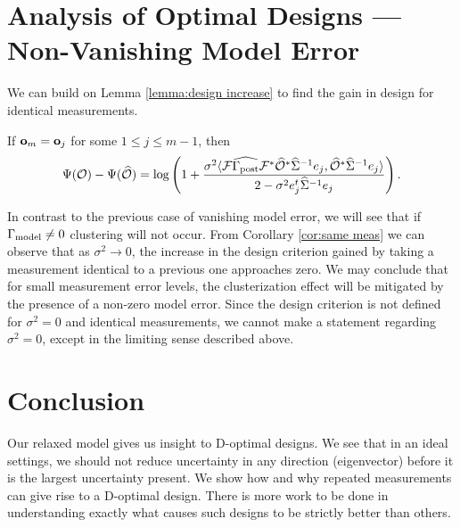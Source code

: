 \documentclass{amsart}
\numberwithin{equation}{section}
\begin{document}
\section{Analysis of Optimal Designs --- Non-Vanishing Model Error}
We can build on Lemma \ref{lemma:design increase} to find the gain in design
for identical measurements.
\begin{corollary}\label{cor:same meas}
  If $\mathbf{o}_m = \mathbf{o}_j$ for some $1 \leq j \leq m-1$, then
  \begin{equation*}
    \Psi(\mathcal{O}) - \Psi(\widehat{\mathcal{O}}) =
    \log \left ( 1 + \frac{\sigma^2
      \langle \mathcal{F} \widehat{\Gamma_{\textup{post}}} \mathcal{F}^* \widehat{\mathcal{O}}^* \widehat{\Sigma}^{-1} e_j,
      \widehat{\mathcal{O}}^* \widehat{\Sigma}^{-1}e_j \rangle
    }{
      2 - \sigma^2 e_j^t\widehat{\Sigma}^{-1}e_j 
    }       
    \right ).
  \end{equation*}
\end{corollary}

In contrast to the previous case of vanishing model error, we will see
that if $\Gamma_{\textup{model}} \neq 0$ clustering will not occur. From Corollary
\ref{cor:same meas} we can observe that as $\sigma^2 \to 0$, the
increase in the design criterion gained by taking a measurement
identical to a previous one approaches zero. We may conclude that for
small measurement error levels, the clusterization effect will be
mitigated by the presence of a non-zero model error. Since the design
criterion is not defined for $\sigma^2 = 0$ and identical
measurements, we cannot make a statement regarding $\sigma^2 = 0$,
except in the limiting sense described above.



\section{Conclusion}\label{section:conclusion}
Our relaxed model gives us insight to D-optimal designs. We see that
in an ideal settings, we should not reduce uncertainty in any
direction (eigenvector) before it is the largest uncertainty present.
We show how and why repeated measurements can give rise to a D-optimal
design. There is more work to be done in understanding exactly what
causes such designs to be strictly better than others.
\end{document}
